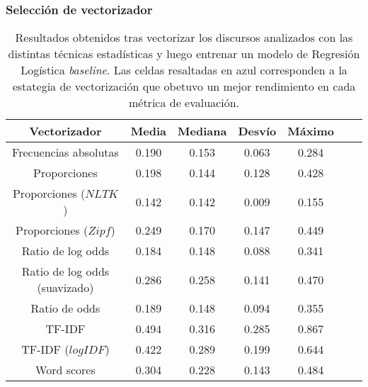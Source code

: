 \subsubsection{Selección de vectorizador}
\label{appendix-table-vectorizers}

\begin{table}[h!]
    \centering
    \begin{tabular}{ |c|c|c|c|c|c|c| }
    \hline
    Vectorizador & Media & Mediana & Desvío & Máximo \\
    \hline\hline
    Frecuencias absolutas & 0.190 & 0.153 & 0.063 & 0.284 \\
    \hline
    Proporciones & 0.198 & 0.144 & 0.128 & 0.428 \\
    \hline
    Proporciones ($NLTK$) & \cellcolor{highlight-blue!60}0.142 & \cellcolor{highlight-blue!60}0.142 & \cellcolor{highlight-blue!60}0.009 & \cellcolor{highlight-blue!60}0.155 \\
    \hline
    Proporciones ($Zipf$) & 0.249 & 0.170 & 0.147 & 0.449 \\
    \hline
    Ratio de log odds & 0.184 & 0.148 & 0.088 & 0.341 \\
    \hline
    Ratio de log odds (suavizado) & 0.286 & 0.258 & 0.141 & 0.470 \\
    \hline
    Ratio de odds & 0.189 & 0.148 & 0.094 & 0.355 \\
    \hline
    TF-IDF & \cellcolor{highlight-orange!60}0.494 & \cellcolor{highlight-orange!60}0.316 & \cellcolor{highlight-orange!60}0.285 & \cellcolor{highlight-orange!60}0.867 \\
    \hline
    TF-IDF ($log IDF$) & 0.422 & 0.289 & 0.199 & 0.644 \\
    \hline
    Word scores & 0.304 & 0.228 & 0.143 & 0.484 \\
    \hline
\end{tabular}
\caption{Resultados obtenidos tras vectorizar los discursos analizados
con las distintas técnicas estadísticas y luego entrenar un modelo de
Regresión Logística \textit{baseline}. Las celdas resaltadas en azul corresponden
a la estategia de vectorización que obetuvo un mejor rendimiento en cada
métrica de evaluación.}
\label{table-appendix-fit-time}
\end{table}

   